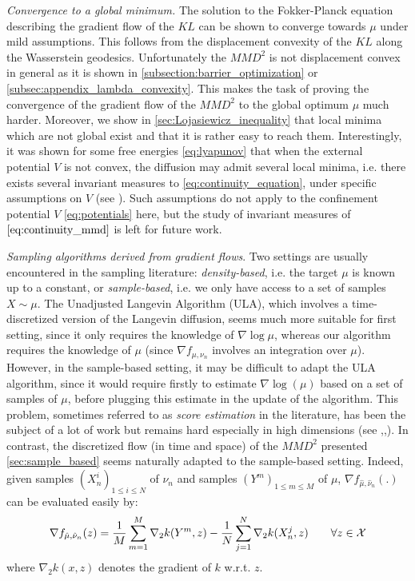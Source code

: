 \textit{Convergence to a global minimum.} The solution to the Fokker-Planck equation describing the gradient flow of the $KL$ can be shown to converge towards $\mu$ under mild assumptions. This follows from the displacement convexity of the $KL$ along the Wasserstein geodesics. Unfortunately the $MMD^2$ is not displacement convex in general as it is shown in \cref{subsection:barrier_optimization} or \cref{subsec:appendix_lambda_convexity}. This makes the task of proving the convergence of the gradient flow of the $MMD^2$ to the global optimum $\mu$ much harder. Moreover, we show in \cref{sec:Lojasiewicz_inequality} that local minima which are not global exist and that it is rather easy to reach them. Interestingly, it was shown for some free energies \eqref{eq:lyapunov} that when the external potential $V$ is not convex, the diffusion may admit several local minima, i.e. there exists several invariant measures to \eqref{eq:continuity_equation}, under specific assumptions on $V$ (see \cite{herrmann2010non,tugaut2014phase}). Such assumptions do not apply to the confinement potential $V$ \eqref{eq:potentials} here, but the study of invariant measures of $\eqref{eq:continuity_mmd}$ is left for future work.

\textit{Sampling algorithms derived from gradient flows}. Two settings are usually encountered in the sampling literature: \textit{density-based}, i.e. the target $\mu$ is known up to a constant, or \textit{sample-based}, i.e. we only have access to a set of samples $X \sim \mu$.
	The Unadjusted Langevin Algorithm (ULA), which involves a time-discretized version of the Langevin diffusion, seems much more suitable for first setting, since it only requires the knowledge of $\nabla \log \mu$, whereas our algorithm requires the knowledge of $\mu$ (since $\nabla f_{\mu, \nu_n}$ involves an integration over $\mu$). However, in the sample-based setting, it may be difficult to adapt the ULA algorithm, since it would require firstly to estimate $\nabla \log(\mu)$ based on a set of samples of $\mu$, before plugging this estimate in the update of the algorithm. This problem, sometimes referred to as \textit{score estimation} in the literature, has been the subject of a lot of work but remains hard especially in high dimensions (see \cite{sutherland2017efficient},\cite{li2018gradient},\cite{shi2018spectral}). In contrast, the discretized flow (in time and space) of the $MMD^2$ presented \cref{sec:sample_based} seems naturally adapted to the sample-based setting. Indeed, given samples $(X_{n}^{i})_{1\le i\le N}$ of $\nu_n$ and samples $(Y^m)_{1 \le m \le M}$ of $\mu$, $\nabla f_{\hat{\mu},\hat{\nu}_n}(.)$ can be evaluated easily by:
	\begin{align}
		 \nabla f_{\hat{\mu},\hat{\nu}_n}(z) = \frac{1}{M}\sum\limits_{m=1}^M \nabla_2 k(Y^m,z)-\frac{1}{N}\sum\limits_{j=1}^N \nabla_2 k(X_n^j,z) \qquad \forall z\in{{\mathcal X}}
	\end{align}
	where $\nabla_2 k(x,z)$ denotes the gradient of $k$ w.r.t. $z$. 




